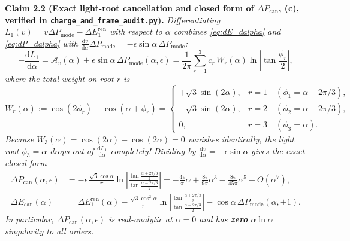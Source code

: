 \documentclass[11pt,a4paper]{article}
\newcommand{\dd}{\mathrm{d}}
\begin{document}
\medskip\noindent
\textbf{Claim 2.2 (Exact light-root cancellation and closed form of $\Delta P_{\mathrm{can}}$, \textbf{(c)}, verified in \texttt{charge\_and\_frame\_audit.py}).}
\emph{Differentiating $L_1(v) = v\Delta P_{\mathrm{mode}} - \Delta E_1^{\mathrm{ren}}$
with respect to $\alpha$ combines \eqref{eq:dE_dalpha} and \eqref{eq:dP_dalpha}
with $\frac{\dd v}{\dd\alpha}\Delta P_{\mathrm{mode}} = -\epsilon\sin\alpha\,\Delta P_{\mathrm{mode}}$:}
\begin{equation}
  -\frac{\dd L_1}{\dd\alpha}
  = \mathcal{A}_v(\alpha) + \epsilon\sin\alpha\,\Delta P_{\mathrm{mode}}(\alpha,\epsilon)
  = \frac{1}{2\pi}\sum_{r=1}^3 c_r\,W_r(\alpha)\ln\!\left|\tan\frac{\phi_r}{2}\right|,
  \label{eq:dL1_dalpha}
\end{equation}
\emph{where the total weight on root $r$ is}
\begin{equation}
  W_r(\alpha) := \cos(2\phi_r) - \cos(\alpha+\phi_r)
  = \begin{cases}
      +\sqrt{3}\sin(2\alpha), & r=1 \quad (\phi_1 = \alpha+2\pi/3), \\
      -\sqrt{3}\sin(2\alpha), & r=2 \quad (\phi_2 = \alpha-2\pi/3), \\
      0, & r=3 \quad (\phi_3 = \alpha).
    \end{cases}
  \label{eq:W_r_weights}
\end{equation}
\emph{Because $W_3(\alpha) = \cos(2\alpha) - \cos(2\alpha) = 0$ vanishes
identically, the light root $\phi_3 = \alpha$ drops out of $\frac{\dd L_1}{\dd\alpha}$
completely! Dividing by $\frac{\dd v}{\dd\alpha} = -\epsilon\sin\alpha$ gives the
exact closed form}
\begin{align}
  \Delta P_{\mathrm{can}}(\alpha,\epsilon)
  &= -\epsilon\,\frac{\sqrt{3}\cos\alpha}{\pi}
     \ln\!\left|\frac{\tan\frac{\alpha+2\pi/3}{2}}{\tan\frac{\alpha-2\pi/3}{2}}\right|
   = -\frac{4\epsilon}{\pi}\alpha + \frac{8\epsilon}{9\pi}\alpha^3 - \frac{8\epsilon}{45\pi}\alpha^5 + O(\alpha^7),
  \label{eq:Delta_P_can} \\
  \Delta E_{\mathrm{can}}(\alpha)
  &= \Delta E_1^{\mathrm{ren}}(\alpha)
     - \frac{\sqrt{3}\cos^2\alpha}{\pi}\ln\!\left|\frac{\tan\frac{\alpha+2\pi/3}{2}}{\tan\frac{\alpha-2\pi/3}{2}}\right|
     - \cos\alpha\,\Delta P_{\mathrm{mode}}(\alpha,+1).
  \label{eq:Delta_E_can}
\end{align}
\emph{In particular, $\Delta P_{\mathrm{can}}(\alpha,\epsilon)$ is real-analytic
at $\alpha=0$ and has \textbf{zero} $\alpha\ln\alpha$ singularity to all orders.}
\end{document}
